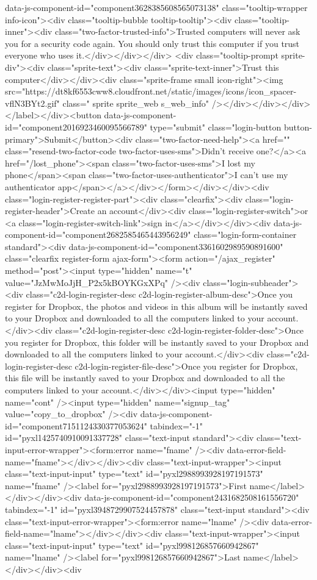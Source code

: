 {data-js-component-id="component3628385608565073138" class="tooltip-wrapper info-icon"><div class="tooltip-bubble tooltip-tooltip"><div class="tooltip-inner"><div class="two-factor-trusted-info">Trusted computers will never ask you for a security code again. You should only trust this computer if you trust everyone who uses it.</div></div></div> <div class="tooltip-prompt sprite-div"><div class="sprite-text"><div class="sprite-text-inner">Trust this computer</div></div><div class="sprite-frame small icon-right"><img src="https://dt8kf6553cww8.cloudfront.net/static/images/icons/icon_spacer-vflN3BYt2.gif" class=" sprite sprite_web s_web_info" /></div></div></div></label></div><button data-js-component-id="component2016923460095566789" type="submit" class="login-button button-primary">Submit</button><div class="two-factor-need-help"><a href="" class="resend-two-factor-code two-factor-uses-sms">Didn't receive one?</a><a href="/lost_phone"><span class="two-factor-uses-sms">I lost my phone</span><span class="two-factor-uses-authenticator">I can't use my authenticator app</span></a></div></form></div></div><div class="login-register-register-part"><div class="clearfix"><div class="login-register-header">Create an account</div><div class="login-register-switch">or <a class="login-register-switch-link">sign in</a></div></div><div data-js-component-id="component2682585465443956249" class="login-form-container standard"><div data-js-component-id="component3361602989590891600" class="clearfix register-form ajax-form"><form action="/ajax_register" method="post"><input type="hidden" name="t" value="JzMwMoJjH_P2x5kBOYKGxXPq" /><div class="login-subheader"><div class="c2d-login-register-desc c2d-login-register-album-desc">Once you register for Dropbox, the photos and videos in this album will be instantly saved to your Dropbox and downloaded to all the computers linked to your account.</div><div class="c2d-login-register-desc c2d-login-register-folder-desc">Once you register for Dropbox, this folder will be instantly saved to your Dropbox and downloaded to all the computers linked to your account.</div><div class="c2d-login-register-desc c2d-login-register-file-desc">Once you register for Dropbox, this file will be instantly saved to your Dropbox and downloaded to all the computers linked to your account.</div></div><input type="hidden" name="cont" /><input type="hidden" name="signup_tag" value="copy_to_dropbox" /><div data-js-component-id="component7151124330377053624" tabindex="-1" id="pyxl1425740910091337728" class="text-input  standard"><div class="text-input-error-wrapper"><form:error name="fname" /><div data-error-field-name="fname"></div></div><div class="text-input-wrapper"><input class="text-input-input" type="text" id="pyxl2988993928197191573" name="fname" /><label for="pyxl2988993928197191573">First name</label></div></div><div data-js-component-id="component2431682508161556720" tabindex="-1" id="pyxl3948729907524457878" class="text-input  standard"><div class="text-input-error-wrapper"><form:error name="lname" /><div data-error-field-name="lname"></div></div><div class="text-input-wrapper"><input class="text-input-input" type="text" id="pyxl998126857660942867" name="lname" /><label for="pyxl998126857660942867">Last name</label></div></div><div }
